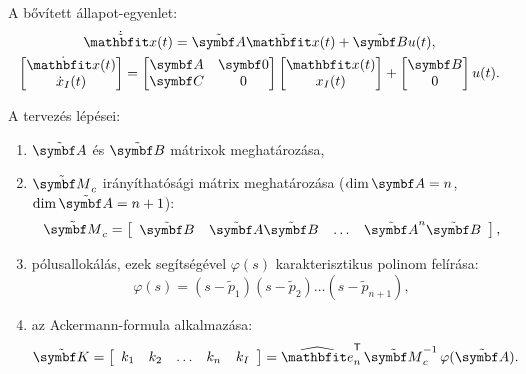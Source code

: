 A bővített állapot-egyenlet:
\begin{gather}
  \dot{\tvec x}(t) = \tmat A \tvec x(t) + \tmat B u(t)
  ,
  \\
  \begin{bmatrix}
    \dot{\rvec x}(t) \\ \dot x_I(t)
  \end{bmatrix} = \begin{bmatrix}
    \rmat A & \rmat 0 \\ \rmat C & 0
  \end{bmatrix} \begin{bmatrix}
    \rvec x(t) \\ x_I(t)
  \end{bmatrix} + \begin{bmatrix}
    \rmat B \\ 0
  \end{bmatrix} u(t)
  .
\end{gather}

A tervezés lépései:
\bgroup
\def\arraystretch{1.2}
\begin{enumerate}[label={\color{darkRed}\theenumi})]
  \item $\tmat A$ és $\tmat B$ mátrixok meghatározása,
  \item $\tmat M_c$ irányíthatósági mátrix meghatározása ($\dim \rmat A = n$,
        $\dim \tmat A = n+1$):
        \begin{equation}
          \tmat M_c = \left[\begin{array}{ c : c : c : c }
              \tmat B         &
              \tmat A \tmat B &
              \dots           &
              \tmat A^{n} \tmat B
            \end{array}\right],
        \end{equation}
  \item pólusallokálás, ezek segítségével $\varphi(s)$ karakterisztikus polinom
        felírása:
        \begin{equation}
          \varphi(s) = (s - \tilde p_1)(s - \tilde p_2) \dots (s - \tilde p_{n+1}),
        \end{equation}
  \item az Ackermann-formula alkalmazása:
        \begin{equation}
          \tmat K = \left[\begin{array}{c c c c : c}
              k_1 & k_2 & \dots & k_n & k_I
            \end{array}\right]
          = \uvec e_n^\T
          \,\tmat M_c^{-1}
          \,\varphi({\tmat A}).
        \end{equation}
\end{enumerate}
\egroup

\clearpage
